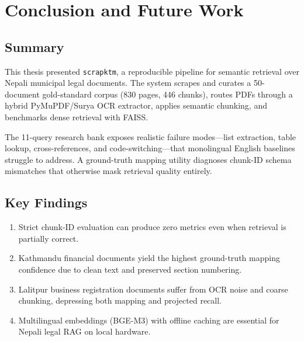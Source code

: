 \chapter{Conclusion and Future Work}
\label{ch:conclusion}

\section{Summary}
This thesis presented \texttt{scrapktm}, a reproducible pipeline for semantic retrieval over Nepali municipal legal documents. The system scrapes and curates a 50-document gold-standard corpus (830 pages, 446 chunks), routes PDFs through a hybrid PyMuPDF/Surya OCR extractor, applies semantic chunking, and benchmarks dense retrieval with FAISS.

The 11-query research bank exposes realistic failure modes---list extraction, table lookup, cross-references, and code-switching---that monolingual English baselines struggle to address. A ground-truth mapping utility diagnoses chunk-ID schema mismatches that otherwise mask retrieval quality entirely.

\section{Key Findings}
\begin{enumerate}[leftmargin=*]
  \item Strict chunk-ID evaluation can produce zero metrics even when retrieval is partially correct.
  \item Kathmandu financial documents yield the highest ground-truth mapping confidence due to clean text and preserved section numbering.
  \item Lalitpur business registration documents suffer from OCR noise and coarse chunking, depressing both mapping and projected recall.
  \item Multilingual embeddings (BGE-M3) with offline caching are essential for Nepali legal RAG on local hardware.
\end{enumerate}

